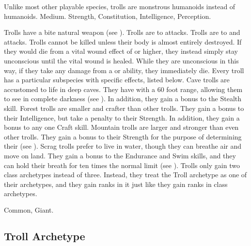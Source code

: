    Unlike most other playable species, trolls are monstrous humanoids instead of humanoids.
   Medium.
    Strength,  Constitution,  Intelligence,  Perception.
  \begin{raggeditemize}
     Trolls have a bite natural weapon (see ).
     Trolls are \impervious to \atPoison attacks.
     Trolls are \vulnerable to \atAcid and \atFire attacks.
     Trolls cannot be killed unless their body is almost entirely destroyed.
      If they would die from a vital wound effect of  or higher, they instead simply stay unconscious until the vital wound is healed.
      While they are unconscious in this way, if they take any damage from a \atAcid or \atFire ability, they immediately die.
     Every troll has a particular subspecies with specific effects, listed below.
       Cave trolls are accustomed to life in deep caves.
      They have  with a 60 foot range, allowing them to see in complete darkness (see ).
      In addition, they gain a  bonus to the Stealth skill.
       Forest trolls are smaller and crafter than other trolls.
      They gain a  bonus to their Intelligence, but take a  penalty to their Strength.
      In addition, they gain a  bonus to any one Craft skill.
       Mountain trolls are larger and stronger than even other trolls.
      They gain a  bonus to their Strength for the purpose of determining their  (see ).
       Scrag trolls prefer to live in water, though they can breathe air and move on land.
      They gain a  bonus to the Endurance and Swim skills, and they can hold their breath for ten times the normal limit (see ).
     Trolls only gain two class archetypes instead of three.
      Instead, they treat the Troll archetype as one of their archetypes, and they gain ranks in it just like they gain ranks in class archetypes.
  \end{raggeditemize}
   Common, Giant.

  \subsection{Troll Archetype}

